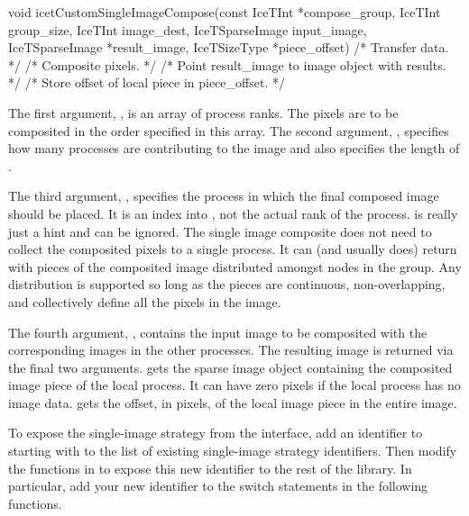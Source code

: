 \begin{code}
void icetCustomSingleImageCompose(const IceTInt *compose_group,
                                  IceTInt group_size,
                                  IceTInt image_dest,
                                  IceTSparseImage input_image,
                                  IceTSparseImage *result_image,
                                  IceTSizeType *piece_offset)
{
    /* Transfer data. */
    /* Composite pixels. */
    /* Point result_image to image object with results. */
    /* Store offset of local piece in piece_offset. */
}
\end{code}

The first argument, , is an array of process ranks.
The pixels are to be composited in the order specified in this array.  The
second argument, , specifies how many processes are
contributing to the image and also specifies the length of
.

The third argument, , specifies the process in which the
final composed image should be placed.  It is an index into
, not the actual rank of the process.
 is really just a hint and can be ignored.  The single
image composite does not need to collect the composited pixels to a single
process.  It can (and usually does) return with pieces of the composited
image distributed amongst nodes in the group.  Any distribution is
supported so long as the pieces are continuous, non-overlapping, and
collectively define all the pixels in the image.

The fourth argument, , contains the input image to be
composited with the corresponding images in the other processes.  The
resulting image is returned via the final two arguments.
 gets the sparse image object containing the composited
image piece of the local process.  It can have zero pixels if the local
process has no image data.   gets the offset, in pixels,
of the local image piece in the entire image.

To expose the single-image strategy from the \IceT interface, add an
identifier to  starting with
 to the list of existing
single-image strategy identifiers.  Then modify the functions in
 to expose this new identifier to the rest
of the \IceT library.  In particular, add your new identifier to the switch
statements in the following functions.

